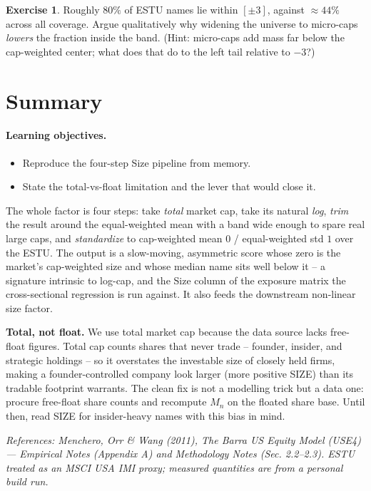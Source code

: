 \documentclass[11pt]{article}
\theoremstyle{definition}
\newtheorem{exercise}{Exercise}[section]
\theoremstyle{plain}
\theoremstyle{remark}
\begin{document}
\begin{exercise}
Roughly $80\%$ of ESTU names lie within $[\pm 3]$, against $\approx 44\%$ across all coverage. Argue qualitatively why widening the universe to micro-caps \emph{lowers} the fraction inside the band. (Hint: micro-caps add mass far below the cap-weighted center; what does that do to the left tail relative to $-3$?)
\end{exercise}

\section{Summary}\label{sec:summary}

\paragraph{Learning objectives.}
\begin{itemize}[leftmargin=1.4em,topsep=2pt,itemsep=1pt]
  \item Reproduce the four-step Size pipeline from memory.
  \item State the total-vs-float limitation and the lever that would close it.
\end{itemize}

The whole factor is four steps: take \emph{total} market cap, take its natural \emph{log}, \emph{trim} the result around the equal-weighted mean with a band wide enough to spare real large caps, and \emph{standardize} to cap-weighted mean $0$ / equal-weighted std $1$ over the ESTU. The output is a slow-moving, asymmetric score whose zero is the market's cap-weighted size and whose median name sits well below it -- a signature intrinsic to log-cap, and the Size column of the exposure matrix the cross-sectional regression is run against. It also feeds the downstream non-linear size factor.

\begin{pitfall}
\textbf{Total, not float.} We use total market cap because the data source lacks free-float figures. Total cap counts shares that never trade -- founder, insider, and strategic holdings -- so it overstates the investable size of closely held firms, making a founder-controlled company look larger (more positive SIZE) than its tradable footprint warrants. The clean fix is not a modelling trick but a data one: procure free-float share counts and recompute $M_n$ on the floated share base. Until then, read SIZE for insider-heavy names with this bias in mind.
\end{pitfall}

\begin{center}\small\itshape
References: Menchero, Orr \& Wang (2011), \textit{The Barra US Equity Model (USE4)} --- Empirical Notes (Appendix A) and Methodology Notes (Sec. 2.2--2.3). ESTU treated as an MSCI USA IMI proxy; measured quantities are from a personal build run.
\end{center}
\end{document}
